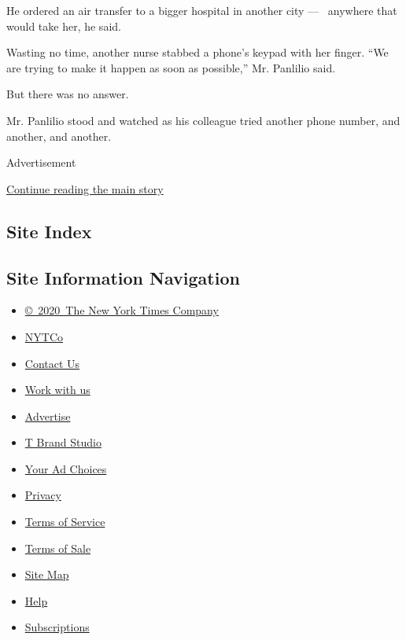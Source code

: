He ordered an air transfer to a bigger hospital in another city ---~
anywhere that would take her, he said.

Wasting no time, another nurse stabbed a phone's keypad with her finger.
``We are trying to make it happen as soon as possible,'' Mr. Panlilio
said.

But there was no answer.

Mr. Panlilio stood and watched as his colleague tried another phone
number, and another, and another.

Advertisement

\protect\hyperlink{after-bottom}{Continue reading the main story}

\hypertarget{site-index}{%
\subsection{Site Index}\label{site-index}}

\hypertarget{site-information-navigation}{%
\subsection{Site Information
Navigation}\label{site-information-navigation}}

\begin{itemize}
\tightlist
\item
  \href{https://help.nytimes3xbfgragh.onion/hc/en-us/articles/115014792127-Copyright-notice}{©~2020~The
  New York Times Company}
\end{itemize}

\begin{itemize}
\tightlist
\item
  \href{https://www.nytco.com/}{NYTCo}
\item
  \href{https://help.nytimes3xbfgragh.onion/hc/en-us/articles/115015385887-Contact-Us}{Contact
  Us}
\item
  \href{https://www.nytco.com/careers/}{Work with us}
\item
  \href{https://nytmediakit.com/}{Advertise}
\item
  \href{http://www.tbrandstudio.com/}{T Brand Studio}
\item
  \href{https://www.nytimes3xbfgragh.onion/privacy/cookie-policy\#how-do-i-manage-trackers}{Your
  Ad Choices}
\item
  \href{https://www.nytimes3xbfgragh.onion/privacy}{Privacy}
\item
  \href{https://help.nytimes3xbfgragh.onion/hc/en-us/articles/115014893428-Terms-of-service}{Terms
  of Service}
\item
  \href{https://help.nytimes3xbfgragh.onion/hc/en-us/articles/115014893968-Terms-of-sale}{Terms
  of Sale}
\item
  \href{https://spiderbites.nytimes3xbfgragh.onion}{Site Map}
\item
  \href{https://help.nytimes3xbfgragh.onion/hc/en-us}{Help}
\item
  \href{https://www.nytimes3xbfgragh.onion/subscription?campaignId=37WXW}{Subscriptions}
\end{itemize}

